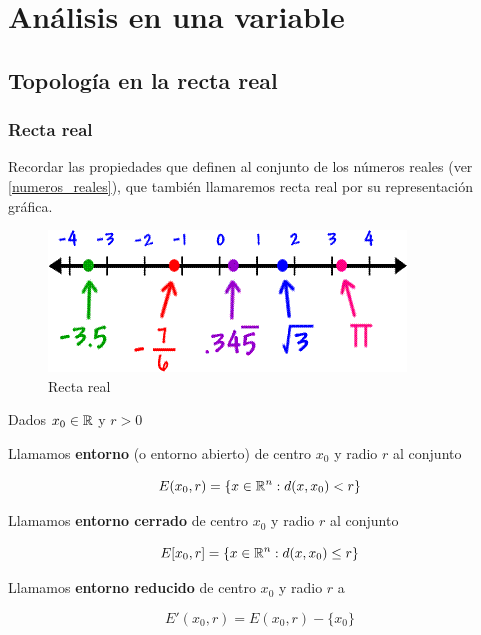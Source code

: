 %
%
%

\part{Análisis en una variable}

\chapter{Topología en la recta real}

\section{Recta real}

Recordar las propiedades que definen al conjunto de los números reales (ver \ref{numeros_reales}), que también llamaremos recta real por su representación gráfica.

\begin{figure}[h]
\centering\includegraphics[scale=0.6]{images/03_analisis1/number_line.png}
\caption{Recta real}
\end{figure}

\begin{definition}[Entorno] \label{entorno_real}
Dados $x_0 \in \mathbb{R}$ y $r > 0$ 
	
Llamamos \textbf{entorno}  (o entorno abierto) de centro $x_0$ y radio $r$ al conjunto
	
$$ E(x_0,r) = \{ x \in \mathbb{R}^n : d(x,x_0) < r\} $$
	
Llamamos \textbf{entorno cerrado} de centro $x_0$ y radio $r$ al conjunto
	
$$ E[x_0,r] = \{ x \in \mathbb{R}^n : d(x,x_0) \leq r\} $$
	
Llamamos \textbf{entorno reducido} de centro $x_0$ y radio $r$ a 
	
$$ E'(x_0,r) = E(x_0,r) - \{x_0\}$$
\end{definition}


